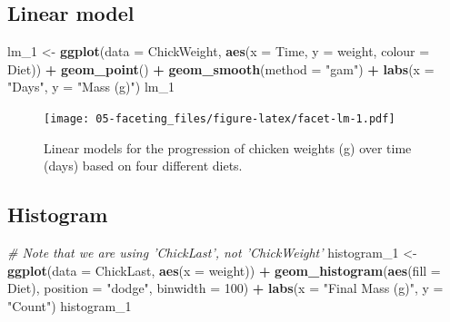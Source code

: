 \documentclass[]{book}
\newenvironment{Shaded}{\begin{snugshade}}{\end{snugshade}}
\newcommand{\KeywordTok}[1]{\textcolor[rgb]{0.13,0.29,0.53}{\textbf{#1}}}
\newcommand{\DataTypeTok}[1]{\textcolor[rgb]{0.13,0.29,0.53}{#1}}
\newcommand{\DecValTok}[1]{\textcolor[rgb]{0.00,0.00,0.81}{#1}}
\newcommand{\StringTok}[1]{\textcolor[rgb]{0.31,0.60,0.02}{#1}}
\newcommand{\CommentTok}[1]{\textcolor[rgb]{0.56,0.35,0.01}{\textit{#1}}}
\newcommand{\OperatorTok}[1]{\textcolor[rgb]{0.81,0.36,0.00}{\textbf{#1}}}
\newcommand{\NormalTok}[1]{#1}
\theoremstyle{definition}
\theoremstyle{definition}
\theoremstyle{definition}
\theoremstyle{remark}
\begin{document}
\subsection{Linear model}\label{linear-model}

\begin{Shaded}
\begin{Highlighting}[]
\NormalTok{lm_}\DecValTok{1}\NormalTok{ <-}\StringTok{ }\KeywordTok{ggplot}\NormalTok{(}\DataTypeTok{data =}\NormalTok{ ChickWeight, }\KeywordTok{aes}\NormalTok{(}\DataTypeTok{x =}\NormalTok{ Time, }\DataTypeTok{y =}\NormalTok{ weight, }\DataTypeTok{colour =}\NormalTok{ Diet)) }\OperatorTok{+}
\StringTok{  }\KeywordTok{geom_point}\NormalTok{() }\OperatorTok{+}
\StringTok{  }\KeywordTok{geom_smooth}\NormalTok{(}\DataTypeTok{method =} \StringTok{"gam"}\NormalTok{) }\OperatorTok{+}
\StringTok{  }\KeywordTok{labs}\NormalTok{(}\DataTypeTok{x =} \StringTok{"Days"}\NormalTok{, }\DataTypeTok{y =} \StringTok{"Mass (g)"}\NormalTok{)}
\NormalTok{lm_}\DecValTok{1}
\end{Highlighting}
\end{Shaded}

\begin{figure}
\centering
\texttt{[image: 05-faceting\_files/figure-latex/facet-lm-1.pdf]}
\caption{\label{fig:facet-lm}Linear models for the progression of chicken
weights (g) over time (days) based on four different diets.}
\end{figure}

\subsection{Histogram}\label{histogram}

\begin{Shaded}
\begin{Highlighting}[]
\CommentTok{# Note that we are using 'ChickLast', not 'ChickWeight'}
\NormalTok{histogram_}\DecValTok{1}\NormalTok{ <-}\StringTok{ }\KeywordTok{ggplot}\NormalTok{(}\DataTypeTok{data =}\NormalTok{ ChickLast, }\KeywordTok{aes}\NormalTok{(}\DataTypeTok{x =}\NormalTok{ weight)) }\OperatorTok{+}
\StringTok{  }\KeywordTok{geom_histogram}\NormalTok{(}\KeywordTok{aes}\NormalTok{(}\DataTypeTok{fill =}\NormalTok{ Diet), }\DataTypeTok{position =} \StringTok{"dodge"}\NormalTok{, }\DataTypeTok{binwidth =} \DecValTok{100}\NormalTok{) }\OperatorTok{+}
\StringTok{  }\KeywordTok{labs}\NormalTok{(}\DataTypeTok{x =} \StringTok{"Final Mass (g)"}\NormalTok{, }\DataTypeTok{y =} \StringTok{"Count"}\NormalTok{)}
\NormalTok{histogram_}\DecValTok{1}
\end{Highlighting}
\end{Shaded}
\end{document}
